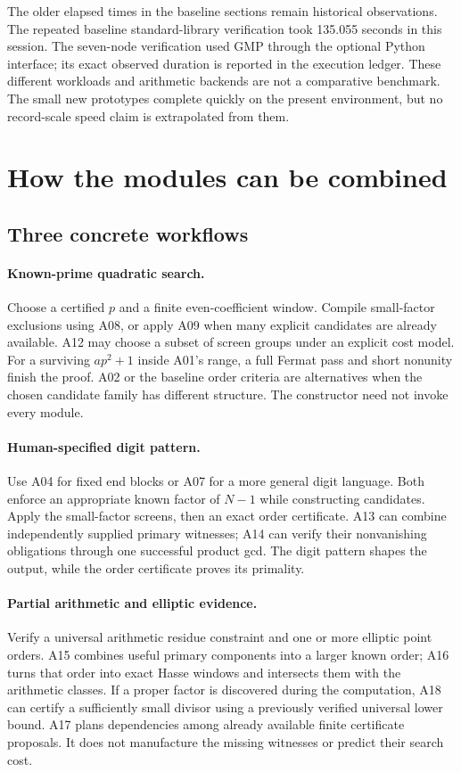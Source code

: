 \documentclass[11pt,a4paper]{article}
\theoremstyle{definition}\newtheorem{definition}[theorem]{Definition}
\theoremstyle{remark}\newtheorem{remark}[theorem]{Remark}
\begin{document}
The older elapsed times in the baseline sections remain historical
observations. The repeated baseline standard-library verification took
135.055 seconds in this session. The seven-node verification used GMP
through the optional Python interface; its exact observed duration is
reported in the execution ledger. These different workloads and arithmetic
backends are not a comparative benchmark. The small new prototypes complete
quickly on the present environment, but no record-scale speed claim is
extrapolated from them.

\section{How the modules can be combined}
\label{sec:revision-composition}

\subsection{Three concrete workflows}

\paragraph{Known-prime quadratic search.}
Choose a certified $p$ and a finite even-coefficient window.
Compile small-factor exclusions using A08, or apply A09 when many
explicit candidates are already available. A12 may choose a subset of
screen groups under an explicit cost model. For a surviving $ap^2+1$
inside A01's range, a full Fermat pass and short nonunity finish the
proof. A02 or the baseline order criteria are alternatives when the
chosen candidate family has different structure. The constructor need
not invoke every module.

\paragraph{Human-specified digit pattern.}
Use A04 for fixed end blocks or A07 for a more general digit language.
Both enforce an appropriate known factor of $N-1$ while constructing
candidates. Apply the small-factor screens, then an exact order
certificate. A13 can combine independently supplied primary witnesses;
A14 can verify their nonvanishing obligations through one successful
product gcd. The digit pattern shapes the output, while the order
certificate proves its primality.

\paragraph{Partial arithmetic and elliptic evidence.}
Verify a universal arithmetic residue constraint and one or more elliptic
point orders. A15 combines useful primary components into a larger known
order; A16 turns that order into exact Hasse windows and intersects
them with the arithmetic classes. If a proper factor is discovered during
the computation, A18 can certify a sufficiently small divisor using a
previously verified universal lower bound. A17 plans dependencies among
already available finite certificate proposals. It does not manufacture
the missing witnesses or predict their search cost.
\end{document}
